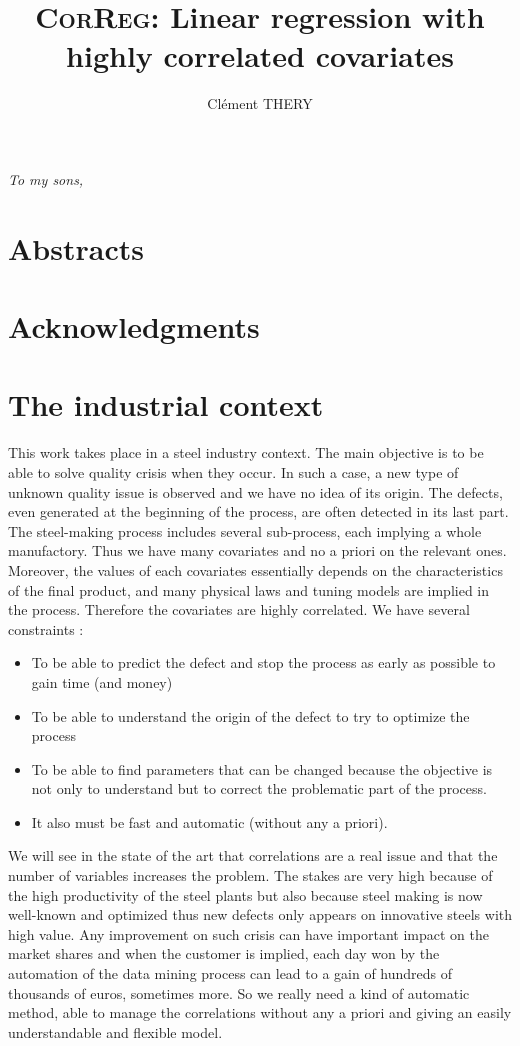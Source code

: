 \documentclass[11pt,a4paper]{report}
\author{Clément THERY}
\title{\textsc{CorReg}: Linear regression with highly correlated covariates}
\begin{document}
\maketitle
\newpage
\itshape To my sons, \upshape
\tableofcontents
\chapter{Abstracts}
\chapter{Acknowledgments}
\chapter{The industrial context}
	This work takes place in a steel industry context. The main objective is to be able to solve quality crisis when they occur. In such a case, a new type of unknown quality issue is observed and we have no idea of its origin. The defects, even generated at the beginning of the process, are often detected in its last part. The steel-making process includes several sub-process, each implying a whole manufactory. Thus we have many covariates and no a priori on the relevant ones. Moreover, the values of each covariates essentially depends on the characteristics of the final product, and many physical laws and tuning models are implied in the process. Therefore the covariates are highly correlated.
	We have several constraints :
	\begin{itemize}
		\item To be able to predict the defect and stop the process as early as possible to gain time (and money)
		\item To be able to understand the origin of the defect to try to optimize the process
		\item To be able to find parameters that can be changed because the objective is not only to understand but to correct the problematic part of the process.
		\item It also must be fast and automatic (without any a priori).
	\end{itemize}
	We will see in the state of the art that correlations are a real issue and that the number of variables increases the problem.	
	The stakes are very high because of the high productivity of the steel plants but also because steel making is now well-known and optimized thus new defects only appears on innovative steels with high value. Any improvement on such crisis can have important impact on the market shares and when the customer is implied, each day won by the automation of the data mining process can lead to a gain of hundreds of thousands of euros, sometimes more. So we really need a kind of automatic method, able to manage the correlations without any a priori and giving an easily understandable and flexible model.
	
\end{document}
